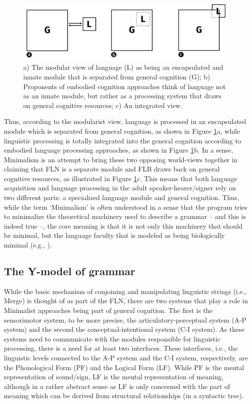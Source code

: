 \begin{figure}[bt]
\centering
	\includegraphics[width=1.0\textwidth]{modelsw.jpg}
	\caption{a) The modular view of language (L) as being an encapsulated and innate module that is separated from general cognition (G); b) Proponents of embodied cognition approaches think of language not as an innate module, but rather as a processing system that draws on general cognitive resources; c) An integrated view.}
	\label{model}
\end{figure}

Thus, according to the modularist view, language is processed in an encapsulated module which is separated from general cognition, as shown in Figure \ref{model}a, while linguistic processing is totally integrated into the general cognition according to embodied language processing approaches, as shown in Figure \ref{model}b.  In a sense, Minimalism is an attempt to bring these two opposing world-views together in claiming that FLN is a separate module and FLB draws back on general cognitive resources, as illustrated in Figure \ref{model}c. This means that both language acquisition and language processing in the adult speaker-hearer/signer rely on two different parts: a specialized language module and general cognition. Thus, while the term `Minimalism' is often understood in a sense that the program tries to minimalize the theoretical machinery used to describe a grammar -- and this is indeed true --, the core meaning is that it is not only this machinery that should be minimal, but the language faculty that is modeled as being biologically minimal (e.g., \citealt{sigurdsson2011uniformity}).

\subsection{The Y-model of grammar}
While the basic mechanism of conjoining and manipulating linguistic strings (i.e., Merge) is thought of as part of the FLN, there are two systems that play a role in Minimalist approaches being part of general cognition. The first is the sensorimotor system, to be more precise, the articulatory-perceptual system (A-P system) and the second the conceptual-intentional system (C-I system). As these systems need to communicate with the modules responsible for linguistic processing, there is a need for at least two interfaces. These interfaces, i.e., the linguistic levels connected to the A-P system and the C-I system, respectively, are the Phonological Form (PF) and the Logical Form (LF). While PF is the mental representation of sound/sign, LF is the mental representation of meaning, although in a rather abstract sense as LF is only concerned with the part of meaning which can be derived from structural relationships (in a syntactic tree).
 
